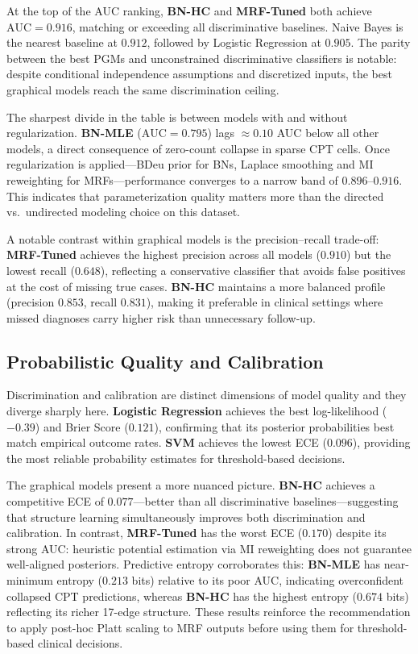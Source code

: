 \documentclass{article}
\begin{document}
At the top of the AUC ranking, \textbf{BN-HC} and \textbf{MRF-Tuned} both achieve $\text{AUC} = 0.916$, matching or exceeding all discriminative baselines. Naive Bayes is the nearest baseline at $0.912$, followed by Logistic Regression at $0.905$. The parity between the best PGMs and unconstrained discriminative classifiers is notable: despite conditional independence assumptions and discretized inputs, the best graphical models reach the same discrimination ceiling.

The sharpest divide in the table is between models with and without regularization. \textbf{BN-MLE} ($\text{AUC} = 0.795$) lags $\approx 0.10$ AUC below all other models, a direct consequence of zero-count collapse in sparse CPT cells. Once regularization is applied---BDeu prior for BNs, Laplace smoothing and MI reweighting for MRFs---performance converges to a narrow band of $0.896$--$0.916$. This indicates that parameterization quality matters more than the directed vs.\ undirected modeling choice on this dataset.

A notable contrast within graphical models is the precision--recall trade-off: \textbf{MRF-Tuned} achieves the highest precision across all models ($0.910$) but the lowest recall ($0.648$), reflecting a conservative classifier that avoids false positives at the cost of missing true cases. \textbf{BN-HC} maintains a more balanced profile (precision $0.853$, recall $0.831$), making it preferable in clinical settings where missed diagnoses carry higher risk than unnecessary follow-up.

\subsection{Probabilistic Quality and Calibration}

Discrimination and calibration are distinct dimensions of model quality and they diverge sharply here. \textbf{Logistic Regression} achieves the best log-likelihood ($-0.39$) and Brier Score ($0.121$), confirming that its posterior probabilities best match empirical outcome rates. \textbf{SVM} achieves the lowest ECE ($0.096$), providing the most reliable probability estimates for threshold-based decisions.

The graphical models present a more nuanced picture. \textbf{BN-HC} achieves a competitive ECE of $0.077$---better than all discriminative baselines---suggesting that structure learning simultaneously improves both discrimination and calibration. In contrast, \textbf{MRF-Tuned} has the worst ECE ($0.170$) despite its strong AUC: heuristic potential estimation via MI reweighting does not guarantee well-aligned posteriors. Predictive entropy corroborates this: \textbf{BN-MLE} has near-minimum entropy ($0.213$ bits) relative to its poor AUC, indicating overconfident collapsed CPT predictions, whereas \textbf{BN-HC} has the highest entropy ($0.674$ bits) reflecting its richer 17-edge structure. These results reinforce the recommendation to apply post-hoc Platt scaling to MRF outputs before using them for threshold-based clinical decisions.
\end{document}
